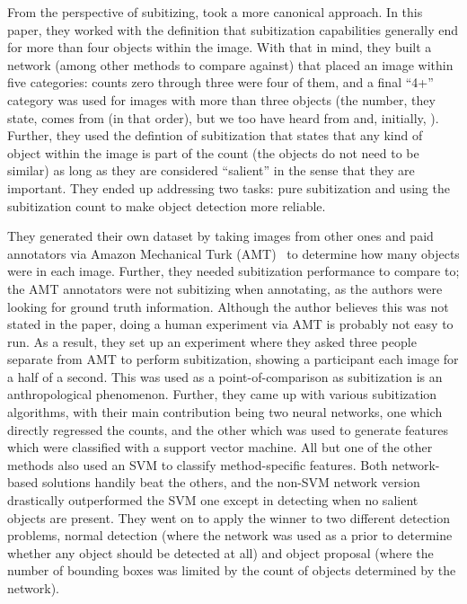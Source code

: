 From the perspective of subitizing, \cite{Zhang_2015_CVPR} took a more canonical approach. In this
paper, they worked with the definition that subitization capabilities generally end for more than
four objects within the image. With that in mind, they built a network (among other methods to
compare against) that placed an image within five categories: counts zero through three were four
of them, and a final ``4+'' category was used for images with more than three objects (the number,
they state, comes from
\cite{edselc.2-52.0-001709992019760101, edssch.oai:escholarship.org/ark:/13030/qt9fn2777219820101}
(in that order), but we too have heard from \cite{edselc.2-52.0-001709992019760101} and, initially,
\cite{subitizingyoutube}). Further, they used the defintion of subitization that states that any
kind of object within the image is part of the count (the objects do not need to be similar) as long
as they are considered ``salient'' in the sense that they are important. They ended up addressing
two tasks: pure subitization and using the subitization count to make object detection more
reliable.

They generated their own dataset by taking images from other ones and paid annotators via Amazon
Mechanical Turk (AMT)~\cite{annotators} to determine how many objects were in each image. Further,
they needed subitization performance to compare to; the AMT annotators were not subitizing when
annotating, as the authors were looking for ground truth information. Although the author believes
this was not stated in the paper, doing a human experiment via AMT is probably not easy to run. As a
result, they set up an experiment where they asked three people separate from AMT to perform
subitization, showing a participant each image for a half of a second. This was used as a
point-of-comparison as subitization is an anthropological phenomenon. Further, they came up with
various subitization algorithms, with their main contribution being two neural networks, one which
directly regressed the counts, and the other which was used to generate features which were
classified with a support vector machine. All but one of the other methods also used an SVM to
classify method-specific features. Both network-based solutions handily beat the others, and the
non-SVM network version drastically outperformed the SVM one except in detecting when no salient
objects are present. They went on to apply the winner to two different detection problems, normal
detection (where the network was used as a prior to determine whether any object should be detected
at all) and object proposal (where the number of bounding boxes was limited by the count of objects
determined by the network).